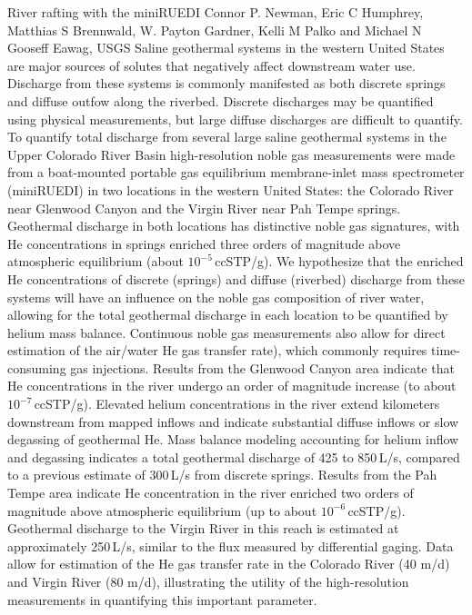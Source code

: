 \begin{conf-abstract}
{River rafting with the miniRUEDI}
{Connor P. Newman, Eric C Humphrey, Matthias S Brennwald, W. Payton Gardner, Kelli M Palko and Michael N Gooseff}
{Eawag, USGS}
{Saline geothermal systems in the western United States are major sources of solutes that negatively affect downstream water use. Discharge from these systems is commonly manifested as both discrete springs and diffuse outfow along the riverbed. Discrete discharges may be quantified using physical measurements, but large diffuse discharges are difficult to quantify. To quantify total discharge from several large saline geothermal systems in the Upper Colorado River Basin high-resolution noble gas measurements were made from a boat-mounted portable gas equilibrium membrane-inlet mass spectrometer (miniRUEDI) in two locations in the western United States: the Colorado River near Glenwood Canyon and the Virgin River near Pah Tempe springs. Geothermal discharge in both locations has distinctive noble gas signatures, with He concentrations in springs enriched three orders of magnitude above atmospheric equilibrium (about $10^{-5}$\,ccSTP/g). We hypothesize that the enriched He concentrations of discrete (springs) and diffuse (riverbed) discharge from these systems will have an influence on the noble gas composition of river water, allowing for the total geothermal discharge in each location to be quantified by helium mass balance. Continuous noble gas measurements also allow for direct estimation of the air/water He gas transfer rate), which commonly requires time-consuming gas injections. Results from the Glenwood Canyon area indicate that He concentrations in the river undergo an order of magnitude increase (to about $10^{-7}$\,ccSTP/g). Elevated helium concentrations in the river extend kilometers downstream from mapped inflows and indicate substantial diffuse inflows or slow degassing of geothermal He. Mass balance modeling accounting for helium inflow and degassing indicates a total geothermal discharge of 425 to 850\,L/s, compared to a previous estimate of 300\,L/s from discrete springs. Results from the Pah Tempe area indicate He concentration in the river enriched two orders of magnitude above atmospheric equilibrium (up to about $10^{-6}$\,ccSTP/g). Geothermal discharge to the Virgin River in this reach is estimated at approximately 250\,L/s, similar to the flux measured by differential gaging. Data allow for estimation of the He gas transfer rate in the Colorado River (40 m/d) and Virgin River (80 m/d), illustrating the utility of the high-resolution measurements in quantifying this important parameter.}
\end{conf-abstract}
